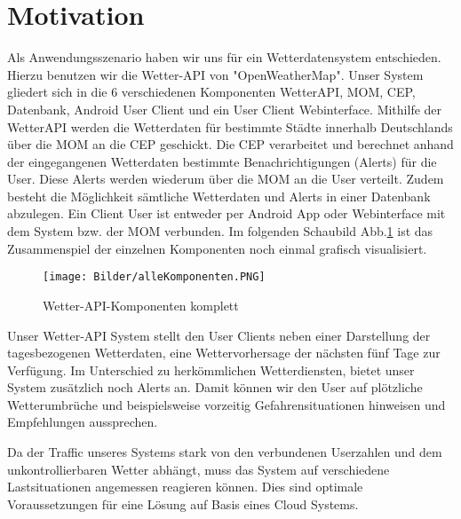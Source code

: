 \section{Motivation}

Als Anwendungsszenario haben wir uns für ein Wetterdatensystem entschieden. Hierzu benutzen wir die Wetter-API von "OpenWeatherMap". Unser System gliedert sich in die 6 verschiedenen Komponenten WetterAPI, MOM, CEP, Datenbank, Android  User Client und ein User Client Webinterface. Mithilfe der WetterAPI werden die Wetterdaten für bestimmte Städte innerhalb Deutschlands über die MOM an die CEP geschickt. Die CEP verarbeitet und berechnet anhand der eingegangenen Wetterdaten bestimmte Benachrichtigungen (Alerts) für die User. Diese Alerts werden wiederum über die MOM an die User verteilt.  Zudem besteht die Möglichkeit sämtliche Wetterdaten und Alerts in einer Datenbank abzulegen. Ein Client User ist entweder per Android App oder Webinterface mit dem System bzw. der MOM verbunden.
Im folgenden Schaubild Abb.\ref{img:KomponentenKomplett} ist das Zusammenspiel der einzelnen Komponenten noch einmal grafisch visualisiert.

\begin{figure}[!ht]
	\centering
	\texttt{[image: Bilder/alleKomponenten.PNG]}
	\caption{Wetter-API-Komponenten komplett}
	\label{img:KomponentenKomplett}
\end{figure}

Unser Wetter-API System stellt den User Clients neben einer Darstellung der tagesbezogenen Wetterdaten, eine Wettervorhersage der nächsten fünf Tage zur Verfügung. Im Unterschied zu herkömmlichen Wetterdiensten, bietet unser System zusätzlich noch Alerts an. Damit  können wir den User auf plötzliche Wetterumbrüche und beispielsweise vorzeitig Gefahrensituationen hinweisen und Empfehlungen aussprechen. 

Da der Traffic unseres Systems stark von den verbundenen Userzahlen und dem unkontrollierbaren Wetter abhängt, muss  das System auf verschiedene Lastsituationen angemessen reagieren können. Dies sind optimale Voraussetzungen für eine Lösung auf Basis eines Cloud Systems.

